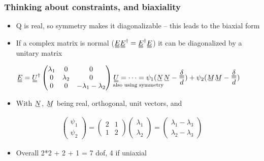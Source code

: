 \documentclass[10pt]{beamer}
\begin{document}
\begin{frame}
\frametitle{Thinking about constraints, and biaxiality}
\begin{itemize}
    \item Q is real, so symmetry makes it diagonalizable -- this leads to the biaxial form
    \item If a complex matrix is normal ($\du{E}\du{E}^\dagger=\du{E}^\dagger\du{E}$) it can be diagonalized by a unitary matrix
\end{itemize}
\begin{align*}
    \du{E} &= \du{U}^\dagger \begin{pmatrix}
        \lambda_1 & 0 & 0 \\
        0 & \lambda_2 & 0 \\
        0 & 0 & - \lambda_1 - \lambda_2
    \end{pmatrix} \underset{\text{also using symmetry}}{\du{U} = \cdots = \psi_1(\su{N}}\su{N} - \frac{\du{\delta}}{d}) + \psi_2(\su{M}\su{M} - \frac{\du{\delta}}{d})
\end{align*}
\begin{itemize}
    \item With $\su{N}$, $\su{M}$ being real, orthogonal, unit vectors, and
\end{itemize}
\begin{align*}
    \begin{pmatrix} \psi_1 \\ \psi_2 \end{pmatrix} = \begin{pmatrix} 2 & 1 \\ 1 & 2 \end{pmatrix} \begin{pmatrix} \lambda_1 \\ \lambda_2 \end{pmatrix} = \begin{pmatrix} \lambda_1 - \lambda_3 \\ \lambda_2 - \lambda_3 \end{pmatrix}
\end{align*}
\begin{itemize}
    \item Overall 2*2 + 2 + 1 = 7 dof, 4 if uniaxial
\end{itemize}
\end{frame}

\setlength{\abovedisplayskip}{1em}
\setlength{\belowdisplayskip}{0ex}
\end{document}
